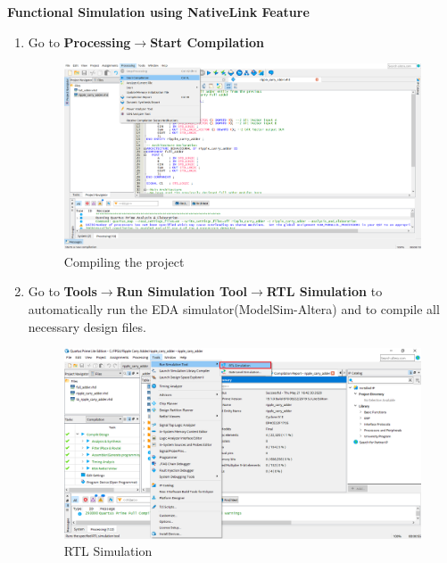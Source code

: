 \documentclass[12pt,singleside,a4paper]{article}
\begin{document}
 \noindent \textbf{Functional Simulation using NativeLink Feature}
    \begin{enumerate}
        
        \item  Go to \textbf{Processing}$\rightarrow$\textbf{Start Compilation}
            \begin{figure}[H]
                \centering
                \includegraphics[width=14cm,keepaspectratio]{img7.png}
            \caption{Compiling the project}
            \end{figure}
    
        \newpage
        \item Go to \textbf{Tools}$\rightarrow$\textbf{Run Simulation Tool}$\rightarrow$\textbf{RTL Simulation} to automatically run the EDA simulator(ModelSim-Altera) and to compile all necessary design files.
            \begin{figure}[H]
                \centering
                \includegraphics[width=14cm,keepaspectratio]{img28.png}
            \caption{RTL Simulation}
            \end{figure}


\end{enumerate}
\end{document}
